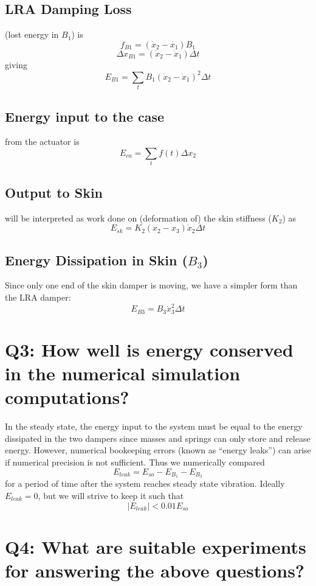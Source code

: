 \documentclass[letterpaper,11pt]{article}
\begin{document}
\subsection{LRA Damping Loss}
    (lost energy in $B_1$) is
    \[
    f_{B1} = (\dot{x}_2-\dot{x_1})B_1
    \]
    \[
    \Delta x_{B1} = (\dot{x}_2-\dot{x}_1)\Delta t
    \]
    giving
    \[
    E_{B1} = \sum_t B_1(\dot{x}_2-\dot{x}_1)^2\Delta t
    \]

\subsection{Energy input to the case}  from the actuator is
    \[
    E_{ca} = \sum_t  f(t)\Delta x_2
    \]


\subsection{Output to Skin} will be interpreted as  work done on
    (deformation of) the skin stiffness ($K_2$) as
    \[
    E_{sk} = K_2(x_2-x_3)\dot{x}_2 \Delta t
    \]

\subsection{Energy Dissipation in Skin ($B_3$)}
    Since only one end of the skin damper is moving, we have a simpler form than the LRA damper:
    \[
    E_{B3} = B_3\dot{x}_3^2\Delta t
    \]


\section{Q3: How well is energy conserved in the numerical simulation computations?}

In the steady state, the energy input to the system must be equal to the energy dissipated in the two
dampers since masses and springs can only store and release energy.  However, numerical bookeeping
errors (known as ``energy leaks'') can arise if numerical precision is not sufficient.  Thus we
numerically compared
\[
E_{leak} = E_{so} - E_{B_1} - E_{B_3}
\]
for a period of time after the system reaches steady state vibration. Ideally $E_{leak}=0$, but we will
strive to keep it such that
\begin{equation}\label{EqnEnergyBalance}
|E_{leak}| < 0.01 E_{so}
\end{equation}


\section{Q4: What are suitable experiments for answering the above questions?}
\end{document}
